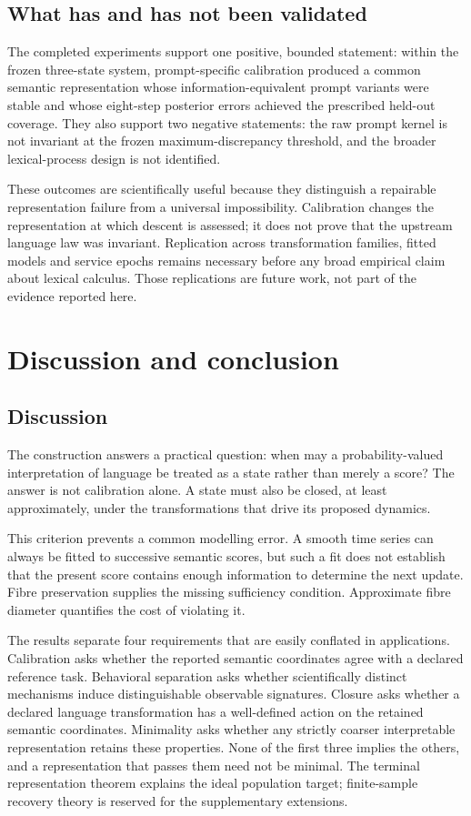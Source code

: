 \documentclass[11pt]{article}
\begin{document}
\subsection{What has and has not been validated}

The completed experiments support one positive, bounded statement:
within the frozen three-state system, prompt-specific calibration produced a
common semantic representation whose information-equivalent prompt variants
were stable and whose eight-step posterior errors achieved the prescribed
held-out coverage.  They also support two negative statements: the raw prompt
kernel is not invariant at the frozen maximum-discrepancy threshold, and the
broader lexical-process design is not identified.

These outcomes are scientifically useful because they distinguish a repairable
representation failure from a universal impossibility.  Calibration changes
the representation at which descent is assessed; it does not prove that the
upstream language law was invariant.  Replication across transformation
families, fitted models and service epochs remains necessary before any broad
empirical claim about lexical calculus.  Those replications are future work,
not part of the evidence reported here.

\section{Discussion and conclusion}

\subsection{Discussion}

The construction answers a practical question: when may a probability-valued interpretation of language be treated as a state rather than merely a score? The answer is not calibration alone. A state must also be closed, at least approximately, under the transformations that drive its proposed dynamics.

This criterion prevents a common modelling error. A smooth time series can always be fitted to successive semantic scores, but such a fit does not establish that the present score contains enough information to determine the next update. Fibre preservation supplies the missing sufficiency condition. Approximate fibre diameter quantifies the cost of violating it.

The results separate four requirements that are easily conflated in applications. Calibration asks whether the reported semantic coordinates agree with a declared reference task. Behavioral separation asks whether scientifically distinct mechanisms induce distinguishable observable signatures. Closure asks whether a declared language transformation has a well-defined action on the retained semantic coordinates. Minimality asks whether any strictly coarser interpretable representation retains these properties. None of the first three implies the others, and a representation that passes them need not be minimal. The terminal representation theorem explains the ideal population target; finite-sample recovery theory is reserved for the supplementary extensions.
\end{document}

